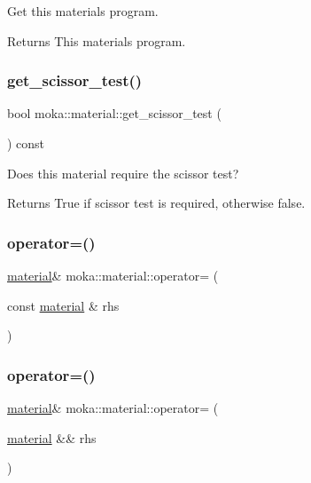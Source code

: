 Get this material\textquotesingle{}s program. 

\begin{DoxyReturn}{Returns}
This material\textquotesingle{}s program. 
\end{DoxyReturn}
\mbox{\label{classmoka_1_1material_a1e08a9a97d6705e17b299c59eb590833}} 
\subsubsection{\texorpdfstring{get\_scissor\_test()}{get\_scissor\_test()}}
{\footnotesize\ttfamily bool moka\+::material\+::get\+\_\+scissor\+\_\+test (\begin{DoxyParamCaption}{ }\end{DoxyParamCaption}) const}



Does this material require the scissor test? 

\begin{DoxyReturn}{Returns}
True if scissor test is required, otherwise false. 
\end{DoxyReturn}
\mbox{\label{classmoka_1_1material_a90042ca024f8fe181e8b6313203f211c}} 
\subsubsection{\texorpdfstring{operator=()}{operator=()}\hspace{0.1cm}{\footnotesize\ttfamily [1/2]}}
{\footnotesize\ttfamily \mbox{\hyperlink{classmoka_1_1material}{material}}\& moka\+::material\+::operator= (\begin{DoxyParamCaption}\item[{const \mbox{\hyperlink{classmoka_1_1material}{material}} \&}]{rhs }\end{DoxyParamCaption})}

\mbox{\label{classmoka_1_1material_a00ec8ed5fb0754ed02f53c8f98e9e366}} 
\subsubsection{\texorpdfstring{operator=()}{operator=()}\hspace{0.1cm}{\footnotesize\ttfamily [2/2]}}
{\footnotesize\ttfamily \mbox{\hyperlink{classmoka_1_1material}{material}}\& moka\+::material\+::operator= (\begin{DoxyParamCaption}\item[{\mbox{\hyperlink{classmoka_1_1material}{material}} \&\&}]{rhs }\end{DoxyParamCaption})\hspace{0.3cm}{\ttfamily [noexcept]}}

